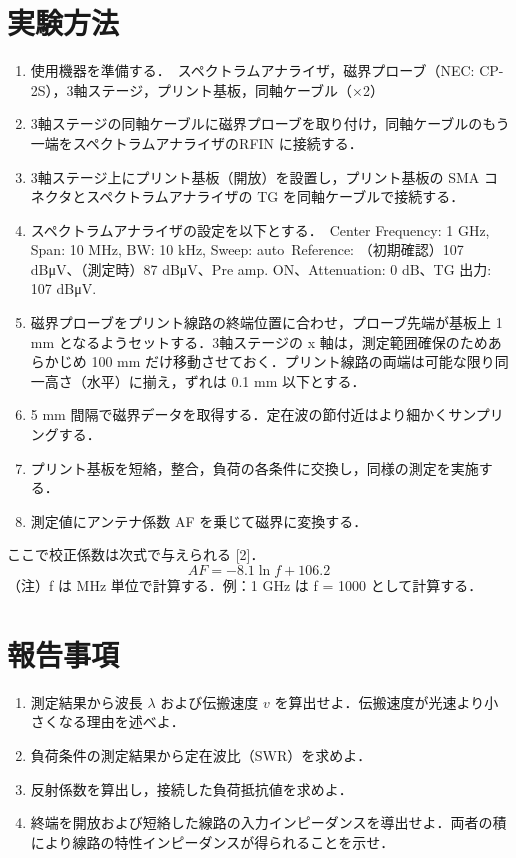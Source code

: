 \documentclass[
  a4paper,  %
  11pt,     %
]{ltjsarticle}
\begin{document}
\section{実験方法}
\begin{enumerate}
  \item 使用機器を準備する．\
    スペクトラムアナライザ，磁界プローブ（NEC: CP-2S），3軸ステージ，プリント基板，同軸ケーブル（×2）
  \item 3軸ステージの同軸ケーブルに磁界プローブを取り付け，同軸ケーブルのもう一端をスペクトラムアナライザのRFIN に接続する．
  \item 3軸ステージ上にプリント基板（開放）を設置し，プリント基板の SMA コネクタとスペクトラムアナライザの TG を同軸ケーブルで接続する．
  \item スペクトラムアナライザの設定を以下とする．\
    Center Frequency: 1 GHz, Span: 10 MHz, BW: 10 kHz, Sweep: auto\
    Reference: （初期確認）107 dBμV、（測定時）87 dBμV、Pre amp. ON、Attenuation: 0 dB、TG 出力: 107 dBμV.
  \item 磁界プローブをプリント線路の終端位置に合わせ，プローブ先端が基板上 1 mm となるようセットする．3軸ステージの x 軸は，測定範囲確保のためあらかじめ 100 mm だけ移動させておく．プリント線路の両端は可能な限り同一高さ（水平）に揃え，ずれは 0.1 mm 以下とする．
  \item 5 mm 間隔で磁界データを取得する．定在波の節付近はより細かくサンプリングする．
  \item プリント基板を短絡，整合，負荷の各条件に交換し，同様の測定を実施する．
  \item 測定値にアンテナ係数 AF を乗じて磁界に変換する．
\end{enumerate}
ここで校正係数は次式で与えられる [2]．
\begin{equation}
  AF = -8.1 \ln f + 106.2
\end{equation}
（注）f は MHz 単位で計算する．例：1 GHz は f = 1000 として計算する．

\section{報告事項}
\begin{enumerate}
  \item 測定結果から波長 $\lambda$ および伝搬速度 $v$ を算出せよ．伝搬速度が光速より小さくなる理由を述べよ．
  \item 負荷条件の測定結果から定在波比（SWR）を求めよ．
  \item 反射係数を算出し，接続した負荷抵抗値を求めよ．
  \item 終端を開放および短絡した線路の入力インピーダンスを導出せよ．両者の積により線路の特性インピーダンスが得られることを示せ．
\end{enumerate}
\end{document}

